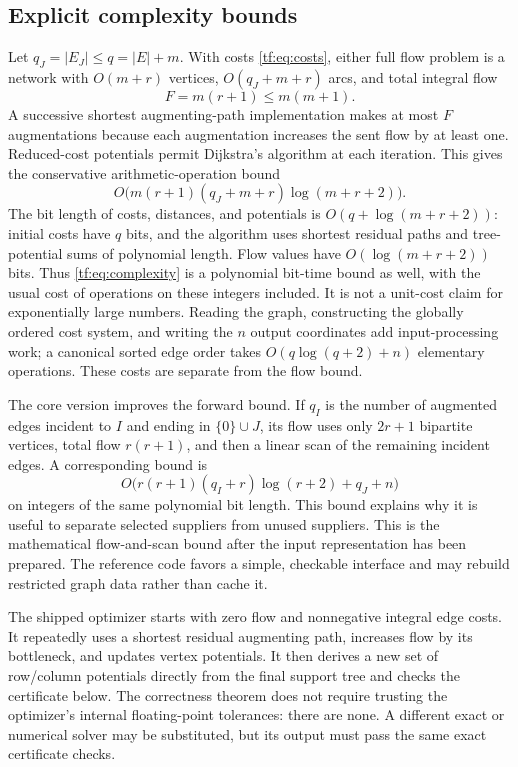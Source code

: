 \documentclass[11pt]{article}
\numberwithin{equation}{section}
\theoremstyle{definition}
\begin{document}
\subsection{Explicit complexity bounds}
Let $q_J=|E_J|\le q=|E|+m$. With costs \eqref{tf:eq:costs}, either full
flow problem is a network with $O(m+r)$ vertices, $O(q_J+m+r)$ arcs,
and total integral flow
\[
 F=m(r+1)\le m(m+1).
\]
A successive shortest augmenting-path implementation makes at most $F$
augmentations because each augmentation increases the sent flow by at
least one. Reduced-cost potentials permit Dijkstra's algorithm at each
iteration. This gives the conservative arithmetic-operation bound
\begin{equation}
 O\bigl(m(r+1)(q_J+m+r)\log(m+r+2)\bigr).
 \label{tf:eq:complexity}
\end{equation}
The bit length of costs, distances, and potentials is
$O(q+\log(m+r+2))$: initial costs have $q$ bits, and the algorithm uses
shortest residual paths and tree-potential sums of polynomial length.
Flow values have $O(\log(m+r+2))$ bits. Thus \eqref{tf:eq:complexity} is a
polynomial bit-time bound as well, with the usual cost of operations on
these integers included. It is not a unit-cost claim for exponentially
large numbers. Reading the graph, constructing the globally ordered cost
system, and writing the $n$ output coordinates add input-processing work;
a canonical sorted edge order takes $O(q\log(q+2)+n)$ elementary operations.
These costs are separate from the flow bound.

The core version improves the forward bound. If $q_I$ is the number of
augmented edges incident to $I$ and ending in $\{0\}\cup J$, its flow
uses only $2r+1$ bipartite vertices, total flow $r(r+1)$, and then a
linear scan of the remaining incident edges. A corresponding bound is
\begin{equation}
 O\bigl(r(r+1)(q_I+r)\log(r+2)+q_J+n\bigr)
 \label{tf:eq:corecomplexity}
\end{equation}
on integers of the same polynomial bit length. This bound explains why
it is useful to separate selected suppliers from unused suppliers.
This is the mathematical flow-and-scan bound after the input representation
has been prepared. The reference code favors a simple, checkable interface
and may rebuild restricted graph data rather than cache it.

The shipped optimizer starts with zero flow and nonnegative integral edge
costs. It repeatedly uses a shortest residual augmenting path, increases
flow by its bottleneck, and updates vertex potentials. It then derives a
new set of row/column potentials directly from the final support tree and
checks the certificate below. The correctness theorem does not require
trusting the optimizer's internal floating-point tolerances: there are
none. A different exact or numerical solver may be substituted, but its
output must pass the same exact certificate checks.
\end{document}
